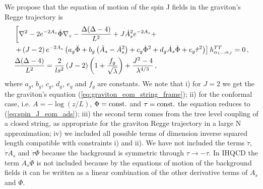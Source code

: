 \documentclass[a4paper,12pt]{article}
\begin{document}
We propose that the equation of motion of the spin J fields in the graviton's Regge trajectory is
\begin{align}
&\left[ \nabla^2 - 2 e^{-2A_s} \dot{\Phi} \nabla_z - \frac{\Delta ( \Delta - 4 )}{L^2} + J {\dot{A}_s}^2 e^{-2A_s} + \right. \notag \\
&\left. + \left( J - 2\right) e^{-2A_s} \left( a_g \ddot{\Phi} + b_g \left( \ddot{A}_s - {\dot{A}_s}^2 \right) + c_g {\dot{\Phi}}^2 + d_g \dot{A}_s \dot{\Phi} + e_g {\dot{\tau}}^2  \right)\right] h^{TT}_{\alpha_1 \dots \alpha_J} = 0 \label{eq:spin_J_proposed} \, ,  \\
&\frac{\Delta ( \Delta - 4 )}{L^2}  = \frac{2}{ls^2} \left(J - 2 \right) \left( 1 + \frac{f_g}{\sqrt{\lambda}} \right) + \frac{J^2 -4}{\lambda^{4/3}} \label{eq:delta_J_proposed_curve} \, ,
\end{align}
where $a_g$, $b_g$, $c_g$, $d_g$, $e_g$ and $f_g$ are constants. We note that i) for $J = 2$ we get the the graviton's equation (\ref{eq:graviton_eom_string_frame}); ii) for the conformal case, i.e. $A = - \log\left(z/L\right)$, $\Phi = \rm{const.}$ and $\tau = \rm{const.}$ the equation reduces to (\ref{eq:spin_J_eom_ads}); iii) the second term comes from the tree level coupling of a closed string, as appropriate for the graviton Regge trajectory in a large N approximation; iv) we included all possible terms of dimension inverse squared length compatible with constraints i) and ii).  We have not included the terms $\ddot{\tau}$, $\dot{\tau} \dot{A}_s$ and $\dot{\tau} \dot{\Phi}$ because the background is symmetric through $\tau \rightarrow - \tau$. In IHQCD the term $\dot{A}_s \dot{\Phi}$ is not included because by the equations of motion of the background fields it can be written as a linear combination of the other derivative terms of $A_s$ and $\Phi$.
\end{document}
